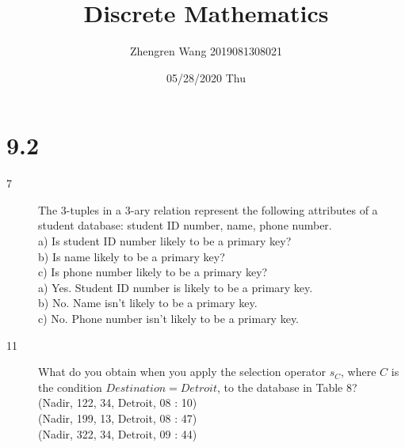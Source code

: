 \documentclass[UTF8]{article}
\title{Discrete Mathematics}
\author{Zhengren Wang 2019081308021}
\date{05/28/2020 Thu }
\begin{document}
\maketitle 

\part{9.2}
\begin{description}
    \item[7]The 3-tuples in a 3-ary relation represent the following attributes of a student database: student ID number, name, phone number. \\
        a) Is student ID number likely to be a primary key?              \\
        b) Is name likely to be a primary key?                           \\
        c) Is phone number likely to be a primary key?                   \\

        a) Yes. Student ID number is likely to be a primary key.            \\
        b) No. Name isn't likely to be a primary key.                      \\
        c) No. Phone number isn't likely to be a primary key.                 \\
    \item[11]What do you obtain when you apply the selection operator $s_C$, where $C$ is the condition $Destination = Detroit$, to the database in Table 8? \\
            (Nadir, 122, 34, Detroit, 08 : 10)      \\
            (Nadir, 199, 13, Detroit, 08 : 47)      \\
            (Nadir, 322, 34, Detroit, 09 : 44)      \\

\end{description}
\end{document}
